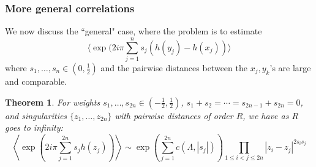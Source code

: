 \documentclass[10pt]{article}
\newtheorem{Thm}[thm]{Theorem}
\begin{document}
\subsubsection{More general correlations}\label{sss:generelectr}

We now discuss the ``general" case, where the problem is to estimate 
$$\langle\exp(2i\pi\sum_{j=1}^ns_j(h(y_j)-h(x_j))\rangle$$
where $s_1,\dots,s_n\in (0,\frac 12)$ and the pairwise distances between the $x_j,y_k$'s are large and comparable.

\begin{Thm}\label{Thm:electr}
For weights $s_1,\dots,s_{2n}\in (-\frac 12,\frac 12)$, $s_1+s_2=\cdots=s_{2n-1}+s_{2n}=0$, and singularities $\{z_1,\dots,z_{2n}\}$ with pairwise distances of order $R$, we have as $R$ goes to infinity:
$$\left\langle\exp(2i\pi\sum_{j=1}^{2n} s_jh(z_j))\right\rangle\sim \exp\left(\sum_{j=1}^{2n}c(\Lambda,|s_j|)\right)\prod_{1\leq i<j\leq 2n}|z_i-z_j|^{2s_is_j}$$
\end{Thm}
\end{document}
